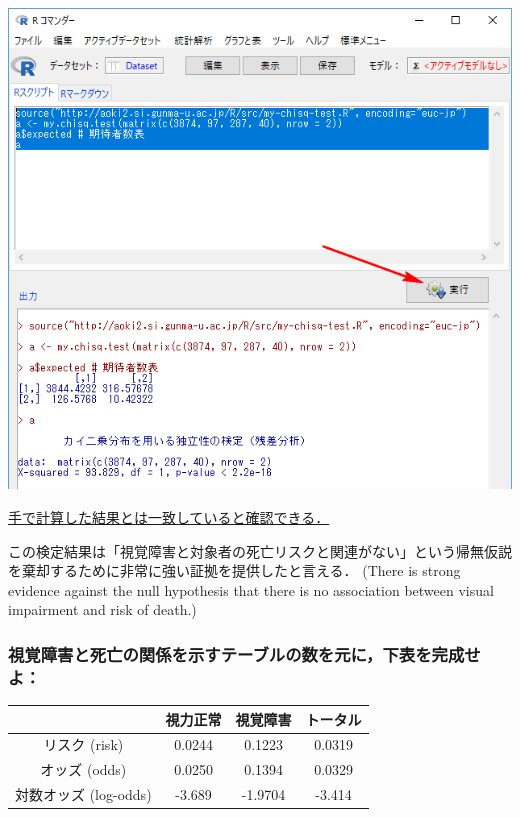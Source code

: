 \documentclass[11pt,]{problemset}
\begin{document}
\begin{center}\includegraphics[width=0.8\linewidth]{pic/mychisqtest01} \end{center}

\underline{手で計算した結果とは一致していると確認できる．}

この検定結果は「視覚障害と対象者の死亡リスクと関連がない」という帰無仮説を棄却するために非常に強い証拠を提供したと言える．
(There is strong evidence against the null hypothesis that there is no
association between visual impairment and risk of death.)

\newpage
\vfill

\subsubsection{視覚障害と死亡の関係を示すテーブルの数を元に，下表を完成せよ：}

\begin{center}
\begin{tabular}{|c|c|c|c|}
\hline
                 & 視力正常   & 視覚障害    & トータル   \\ \hline
リスク (risk)       & 0.0244 & 0.1223  & 0.0319 \\ \hline
オッズ (odds)       & 0.0250 & 0.1394  & 0.0329 \\ \hline
対数オッズ (log-odds) & -3.689 & -1.9704 & -3.414 \\ \hline
\end{tabular}
\end{center}

\bigskip
\end{document}
